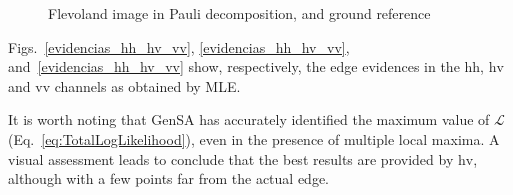 \documentclass[journal]{IEEEtran}
\begin{document}
\begin{figure}[hbt]
   \centering
    \caption{Flevoland image in Pauli decomposition, and ground reference}
    \label{roi_gt}
\end{figure}

Figs.~\ref{evidencias_hh_hv_vv}, \ref{evidencias_hh_hv_vv}, and~\ref{evidencias_hh_hv_vv} show, respectively, the edge evidences in the $\text{hh}$, $\text{hv}$ and $\text{vv}$ channels as obtained by MLE.

It is worth noting that GenSA has accurately identified the maximum value of $\mathcal L$ (Eq.~\eqref{eq:TotalLogLikelihood}), even in the presence of multiple local maxima. 
A visual assessment leads to conclude that the best results are provided by $\text{hv}$, although with a few points far from the actual edge.
\end{document}
